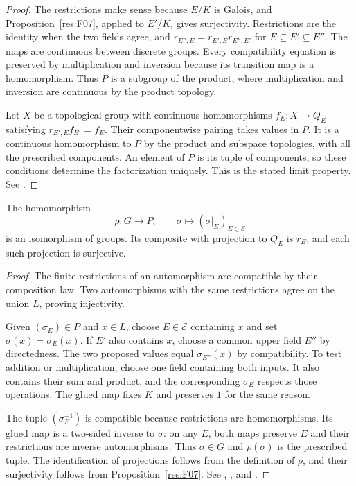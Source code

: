\begin{proof}
The restrictions make sense because \(E/K\) is Galois, and
Proposition~\ref{res:F07}, applied to \(E'/K\), gives surjectivity.
Restrictions are the identity when the two fields agree, and
\(r_{E'',E}=r_{E',E}r_{E'',E'}\) for \(E\subseteq E'\subseteq E''\).
The maps are continuous between discrete groups. Every compatibility
equation is preserved by multiplication and inversion because its
transition map is a homomorphism. Thus \(P\) is a subgroup of the
product, where multiplication and inversion are continuous by the
product topology.

Let \(X\) be a topological group with continuous homomorphisms
\(f_E\colon X\to Q_E\) satisfying \(r_{E',E}f_{E'}=f_E\).
Their componentwise pairing takes values in \(P\). It is a continuous
homomorphism to \(P\) by the product and subspace topologies, with all
the prescribed components. An element of \(P\) is its tuple of
components, so these conditions determine the factorization uniquely.
This is the stated limit property.
See \cite[Examples 7.22--7.23 and 7.26]{milne}.
\end{proof}

\begin{theorem}\label{res:T05}
The homomorphism
\[
 \rho\colon G\longrightarrow P,\qquad
 \sigma\longmapsto (\sigma|_E)_{E\in\mathcal E}
\]
is an isomorphism of groups. Its composite with projection to \(Q_E\)
is \(r_E\), and each such projection is surjective.
\end{theorem}

\begin{proof}
The finite restrictions of an automorphism are compatible by their
composition law. Two automorphisms with the same restrictions agree
on the union \(L\), proving injectivity.

Given \((\sigma_E)\in P\) and \(x\in L\), choose \(E\in\mathcal E\)
containing \(x\) and set \(\sigma(x)=\sigma_E(x)\). If \(E'\) also
contains \(x\), choose a common upper field \(E''\) by directedness.
The two proposed values equal \(\sigma_{E''}(x)\) by compatibility.
To test addition or multiplication, choose one field containing
both inputs. It also contains their sum and product, and the
corresponding \(\sigma_E\) respects those operations. The glued map
fixes \(K\) and preserves \(1\) for the same reason.

The tuple \((\sigma_E^{-1})\) is compatible because restrictions are
homomorphisms. Its glued map is a two-sided inverse to \(\sigma\):
on any \(E\), both maps preserve \(E\) and their restrictions are
inverse automorphisms. Thus \(\sigma\in G\) and \(\rho(\sigma)\) is
the prescribed tuple. The identification of projections follows
from the definition of \(\rho\), and their surjectivity follows
from Proposition~\ref{res:F07}.
See \cite[Example 7.26]{milne},
\cite[Theorem 2.11.1]{rz}, and \cite[Tag 0BU2]{stacks}.
\end{proof}

